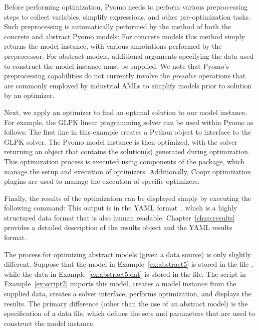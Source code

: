 Before performing optimization, Pyomo needs to perform various preprocessing steps to 
collect variables, simplify expressions, and other pre-optimization tasks. Such preprocessing 
is automatically performed by the  method of both the concrete and abstract Pyomo 
models:
For concrete models this method simply returns the model instance, with various annotations 
performed by the preprocessor. For abstract models, additional arguments specifying the 
data used to construct the model instance must be supplied. We note that Pyomo's preprocessing capabilities do not 
currently involve the \textit{presolve} operations that are commonly employed by industrial
AMLs to simplify models prior to solution by an optimizer.

Next, we apply an optimizer to find an optimal solution to our model instance.  For example, 
the GLPK \cite{glpk} linear programming solver can be used within Pyomo as follows:
The first line in this example creates a Python object to interface to the GLPK solver.
The Pyomo model instance is then optimized, with the solver returning an object that 
contains the solution(s) generated during optimization. This optimization process is 
executed using components of the  package, which manage the setup and execution 
of optimizers.  Additionally, Coopr optimization plugins are used to manage the
execution of specific optimizers.

Finally, the results of the optimization can be displayed simply by executing the
following command:
This output is in the YAML format~\cite{YAML}, which is a highly structured data format 
that is also human readable.  
Chapter~\ref{chap:results} provides a detailed description 
of the results object and the YAML results format.
\fi

The process for optimizing abstract models (given a data source) is only slightly different.  
Suppose that the model in Example~\ref{ex:abstract5} is stored in the file \linebreak {}, 
while the data in Example~\ref{ex:abstract5.dat} is stored in the file\linebreak {}.
The script in Example~\ref{ex:script2} imports this model, creates a model instance from the
supplied data, creates a solver interface, performs optimization, and displays the results.  
The primary difference (other than the use of an abstract model) is the specification of a 
data file, which defines the sets and parameters that are used to construct the model 
instance.

